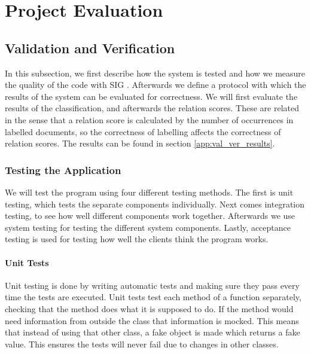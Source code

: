 \chapter{Project Evaluation}



\section{Validation and Verification}
In this subsection, we first describe how the system is tested and how we measure the quality of the code with SIG \cite{sig}. Afterwards we define a protocol with which the results of the system can be evaluated for correctness. We will first evaluate the results of the classification, and afterwards the relation scores. These are related in the sense that a relation score is calculated by the number of occurrences in labelled documents, so the correctness of labelling affects the correctness of relation scores. The results can be found in section \ref{app:val_ver_results}.\\

\subsection{Testing the Application}
We will test the program using four different testing methods. The first is unit testing, which tests the separate components individually. Next comes integration testing, to see how well different components work together. Afterwards we use system testing for testing the different system components. Lastly, acceptance testing is used for testing how well the clients think the program works.

\subsubsection{Unit Tests}
Unit testing is done by writing automatic tests and making sure they pass every time the tests are executed. Unit tests test each method of a function separately, checking that the method does what it is supposed to do. If the method would need information from outside the class that information is mocked. This means that instead of using that other class, a fake object is made which returns a fake value. This ensures the tests will never fail due to changes in other classes.

